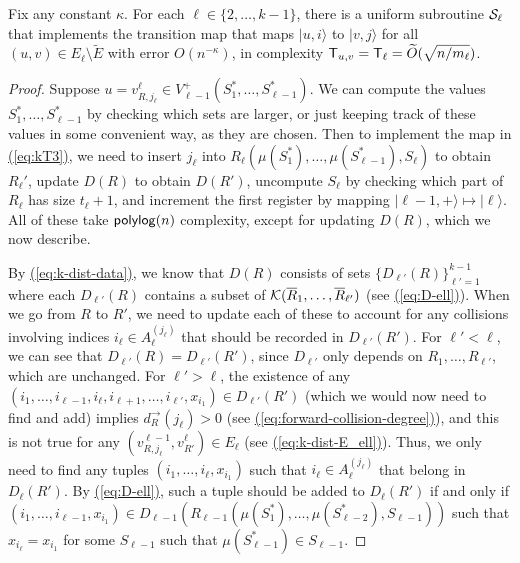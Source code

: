\documentclass{article}
\newcommand{\eq}[1]{\hyperref[eq:#1]{(\ref*{eq:#1})}}
\def\ket#1{{\lvert}#1\rangle}
\renewcommand{\>}{\rangle}
\newcommand{\<}{\langle}
\renewcommand{\(}{\left(}
\renewcommand{\)}{\right)}
\begin{document}
\begin{lemma}\label{lem:k-dist-k1}
	Fix any constant $\kappa$. For each $\ell\in\{2,\dots,k-1\}$, there is a uniform subroutine ${\cal S}_{\ell}$ that implements the transition map that maps $\ket{u,i}$ to $\ket{v,j}$ for all $(u,v)\in E_{\ell}\setminus\tilde{E}$ with error $O(n^{-\kappa})$, in complexity ${\sf T}_{u,v}={\sf T}_{\ell}=\widetilde{O}(\sqrt{n/m_{\ell}})$. 
\end{lemma}
\begin{proof}
Suppose $u=v^{\ell}_{R,j_{\ell}}\in V_{\ell-1}^+(S_1^*,\dots,S_{\ell-1}^*)$. We can compute the values $S_1^*,\dots,S_{\ell-1}^*$ by checking which sets are larger, or just keeping track of these values in some convenient way, as they are chosen. Then to implement the map in \eq{kT3}, we need to insert $j_{\ell}$ into $R_{\ell}(\mu(S_1^*),\dots,\mu(S^*_{\ell-1}),S_{\ell})$ to obtain $R_{\ell}'$, update $D(R)$ to obtain $D(R')$, uncompute $S_{\ell}$ by checking which part of $R_{\ell}$ has size $t_{\ell}+1$, and increment the first register by mapping $\ket{\ell-1,+}\mapsto \ket{\ell}$. All of these take ${\sf polylog}(n)$ complexity, except for updating $D(R)$, which we now describe.

By \eq{k-dist-data}, we know that $D(R)$ consists of sets $\{D_{\ell'}(R)\}_{\ell'=1}^{k-1}$ where each $D_{\ell'}(R)$ contains a subset of ${\cal K}(\overline{R}_1,\dots,\overline{R}_{\ell'})$ (see \eq{D-ell}). When we go from $R$ to $R'$, we need to update each of these to account for any collisions involving indices $i_{\ell}\in A_{\ell}^{(j_{\ell})}$ that should be recorded in $D_{\ell'}(R')$. For $\ell'<\ell$, we can see that $D_{\ell'}(R)=D_{\ell'}(R')$, since $D_{\ell'}$ only depends on $R_1,\dots,R_{\ell'}$, which are unchanged. For $\ell'>\ell$, the existence of any $(i_1,\dots,i_{\ell-1},i_{\ell},i_{\ell+1},\dots,i_{\ell'},x_{i_1})\in D_{\ell'}(R')$ (which we would now need to find and add) implies $d_R^{\rightarrow}(j_{\ell})>0$ (see \eq{forward-collision-degree}), and this is not true for any $(v_{R,j_{\ell}}^{\ell-1},v_{R'}^{\ell})\in E_{\ell}$ (see \eq{k-dist-E_ell}). Thus, we only need to find any tuples $(i_1,\dots,i_{\ell},x_{i_1})$ such that $i_{\ell}\in A_{\ell}^{(j_{\ell})}$ that belong in $D_{\ell}(R')$. By \eq{D-ell}, such a tuple should be added to $D_{\ell}(R')$ if and only if $(i_1,\dots,i_{\ell-1},x_{i_1})\in D_{\ell-1}(R_{\ell-1}(\mu(S_1^*),\dots,\mu(S_{\ell-2}^*),S_{\ell-1}))$ such that $x_{i_{\ell}}=x_{i_1}$ for some $S_{\ell-1}$ such that $\mu(S_{\ell-1}^*)\in S_{\ell-1}$.


\end{proof}
\end{document}
